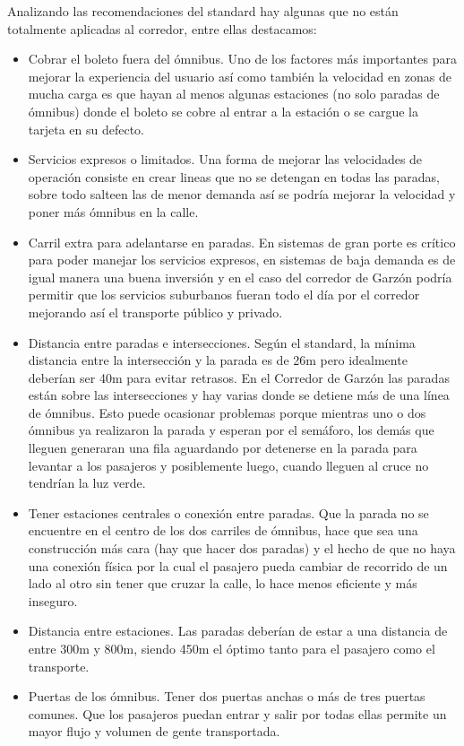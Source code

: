 Analizando las recomendaciones del standard hay algunas que no están totalmente aplicadas al corredor, entre ellas destacamos:

\begin{itemize}
	\item Cobrar el boleto fuera del ómnibus. Uno de los factores más importantes para mejorar la experiencia del usuario así como también la velocidad en zonas de mucha carga es que hayan al menos algunas estaciones (no solo paradas de ómnibus) donde el boleto se cobre al entrar a la estación o se cargue la tarjeta en su defecto.
	\item Servicios expresos o limitados. Una forma de mejorar las velocidades de operación consiste en crear lineas que no se detengan en todas las paradas, sobre todo salteen las de menor demanda así se podría mejorar la velocidad y poner más ómnibus en la calle.
	\item Carril extra para adelantarse en paradas. En sistemas de gran porte es crítico para poder manejar los servicios expresos, en sistemas de baja demanda es de igual manera una buena inversión y en el caso del corredor de Garzón podría permitir que los servicios suburbanos fueran todo el día por el corredor mejorando así el transporte público y privado.
	\item Distancia entre paradas e intersecciones. Según el standard, la mínima distancia entre la intersección y la parada es de 26m pero idealmente deberían ser 40m para evitar retrasos. En el Corredor de Garzón las paradas están sobre las intersecciones y hay varias donde se detiene más de una línea de ómnibus. Esto puede ocasionar problemas porque mientras uno o dos ómnibus ya realizaron la parada y esperan por el semáforo, los demás que lleguen generaran una fila aguardando por detenerse en la parada para levantar a los pasajeros y posiblemente luego, cuando lleguen al cruce no tendrían la luz verde.
	\item Tener estaciones centrales o conexión entre paradas. Que la parada no se encuentre en el centro de los dos carriles de ómnibus, hace que sea una construcción más cara (hay que hacer dos paradas) y el hecho de que no haya una conexión física por la cual el pasajero pueda cambiar de recorrido de un lado al otro sin tener que cruzar la calle, lo hace menos eficiente y más inseguro.
	\item Distancia entre estaciones.  Las paradas deberían de estar a una distancia de entre 300m y 800m, siendo 450m el óptimo tanto para el pasajero como el transporte.
	\item Puertas de los ómnibus. Tener dos puertas anchas o más de tres puertas comunes. Que los pasajeros puedan entrar y salir por todas ellas permite un mayor flujo y volumen de gente transportada.

\end{itemize}

